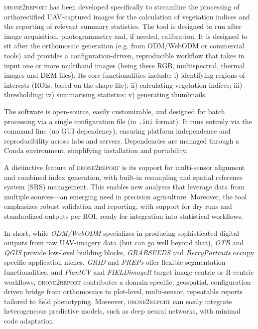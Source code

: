 \documentclass[drones,technicalnote,accept,pdftex,moreauthors]{Definitions/mdpi}
\begin{document}
\textsc{drone2report} has been developed specifically to streamline the processing of orthorectified UAV-captured images for the calculation of vegetation indices and the reporting of relevant summary statistics. The tool is designed to run after image acquisition, photogrammetry and, if needed, calibration. It is designed to sit after the orthomosaic generation (e.g. from ODM/WebODM or commercial tools) and provides a configuration-driven, reproducible workflow that takes in input one or more multiband images (being these RGB, multispectral, thermal images and DEM files). 
Its core functionalities include: i) identifying regions of interests (ROIs, based on the shape file); ii) calculating vegetation indices; iii) thresholding; iv) summarising statistics; v) generating thumbnails.

The software is open-source, easily customizable, and designed for batch processing via a single configuration file (in \texttt{.ini} format). It runs entirely via the command line (no GUI dependency), ensuring platform independence and reproducibility across labs and servers. Dependencies are managed through a Conda environment, simplifying installation and portability.

A distinctive feature of \textsc{drone2report} is its support for multi-sensor alignment and combined index generation, with built-in resampling and spatial reference system (SRS) management. This enables new analyses that leverage data from multiple sources—an emerging need in precision agriculture. Moreover, the tool emphasizes robust validation and reporting, with support for dry runs and standardized outputs per ROI, ready for integration into statistical workflows.

In short, while \textit{ODM/WebODM} specializes in producing sophisticated digital outputs from raw UAV-imagery data (but can go well beyond that), \textit{OTB} and \textit{QGIS} provide low-level building blocks, \textit{GRABSEEDS} and \textit{BerryPortraits} occupy specific application niches, \textit{GRID} and \textit{PREPs} offer flexible segmentation functionalities, and \textit{PlantCV} and \textit{FIELDimageR} target image-centric or R-centric workflows, \textsc{drone2report} contributes a domain-specific, geospatial, configuration-driven bridge from orthomosaics to plot-level, multi-sensor, repeatable reports tailored to field phenotyping. Moreover, \textsc{drone2report} can easily integrate heterogeneous predictive models, such as deep neural networks, with minimal code adaptation.
\end{document}
